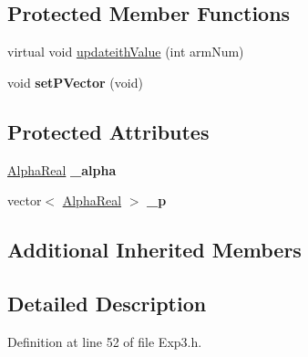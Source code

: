 \subsection*{Protected Member Functions}
\begin{DoxyCompactItemize}
\item 
virtual void \hyperlink{classMultiBoost_1_1Hedge_a49a9fa2dc295c11be60d43e3a6a102e7}{updateith\-Value} (int arm\-Num)
\item 
\hypertarget{classMultiBoost_1_1Hedge_a50c7fe62aa5a48bc322e542072ffb207}{void {\bfseries set\-P\-Vector} (void)}\label{classMultiBoost_1_1Hedge_a50c7fe62aa5a48bc322e542072ffb207}

\end{DoxyCompactItemize}
\subsection*{Protected Attributes}
\begin{DoxyCompactItemize}
\item 
\hypertarget{classMultiBoost_1_1Hedge_a9e6d18f351d87f1900ddb2290e6f4753}{\hyperlink{Defaults_8h_a80184c4fd10ab70a1a17c5f97dcd1563}{Alpha\-Real} {\bfseries \-\_\-alpha}}\label{classMultiBoost_1_1Hedge_a9e6d18f351d87f1900ddb2290e6f4753}

\item 
\hypertarget{classMultiBoost_1_1Hedge_ae17ad3d3c3f09adcc5329120fe5c8e1d}{vector$<$ \hyperlink{Defaults_8h_a80184c4fd10ab70a1a17c5f97dcd1563}{Alpha\-Real} $>$ {\bfseries \-\_\-p}}\label{classMultiBoost_1_1Hedge_ae17ad3d3c3f09adcc5329120fe5c8e1d}

\end{DoxyCompactItemize}
\subsection*{Additional Inherited Members}


\subsection{Detailed Description}


Definition at line 52 of file Exp3.\-h.



